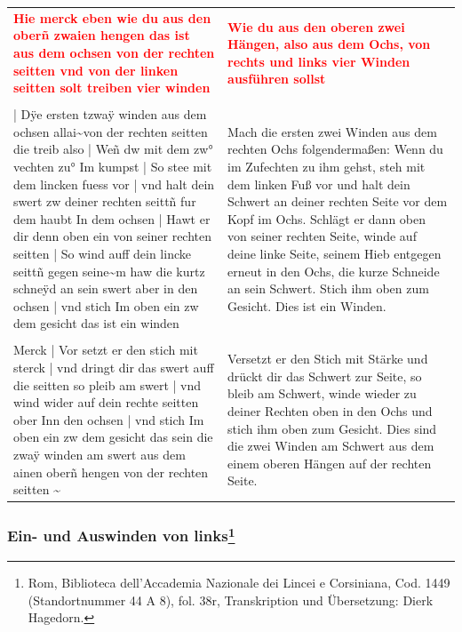 \begin{longtable}{p{6.25cm}p{6.25cm}}
\textbf{\textcolor{red}{Hie merck eben wie du aus den oberñ zwaien hengen das ist aus dem ochsen von der rechten seitten vnd von der linken seitten solt treiben vier winden}}
&
\textbf{\textcolor{red}{Wie du aus den oberen zwei Hängen, also aus dem Ochs, von rechts und links vier Winden ausführen sollst}}
\\
\\
| Dÿe ersten tzwaÿ winden aus dem ochsen allai\textasciitilde  von der rechten seitten die treib also | Weñ dw mit dem zw° vechten zu° Im kumpst | So stee mit dem lincken fuess vor | vnd halt dein swert zw deiner rechten seittñ fur dem haubt In dem ochsen | Hawt er dir denn oben ein von seiner rechten seitten | So wind auff dein lincke seittñ gegen seine\textasciitilde m haw die kurtz schneÿd an sein swert aber in den ochsen | vnd stich Im oben ein zw dem gesicht das ist ein winden 
&
Mach die ersten zwei Winden aus dem rechten Ochs folgendermaßen: Wenn du im Zufechten zu ihm gehst, steh mit dem linken Fuß vor und halt dein Schwert an deiner rechten Seite vor dem Kopf im Ochs. Schlägt er dann oben von seiner rechten Seite, winde auf deine linke Seite, seinem Hieb entgegen erneut in den Ochs, die kurze Schneide an sein Schwert. Stich ihm oben zum Gesicht. Dies ist ein Winden.
\\
\\
Merck | Vor setzt er den stich mit sterck | vnd dringt dir das swert auff die seitten so pleib am swert | vnd wind wider auf dein rechte seitten ober Inn den ochsen | vnd stich Im oben ein zw dem gesicht das sein die zwaÿ winden am swert aus dem ainen oberñ hengen von der rechten seitten \textasciitilde 
&
Versetzt er den Stich mit Stärke und drückt dir das Schwert zur Seite, so bleib am Schwert, winde wieder zu deiner Rechten oben in den Ochs und stich ihm oben zum Gesicht. Dies sind die zwei Winden am Schwert aus dem einem oberen Hängen auf der rechten Seite.
\end{longtable}

\newpage

\begin{center}
\end{center}

\newpage

\subsubsection[Ein- und Auswinden von links]{Ein- und Auswinden von links\footnote{\hspace*{0.5ex}Rom, Biblioteca dell'Accademia Nazionale dei Lincei e Corsiniana, Cod. 1449 (Standortnummer 44 A 8), fol. 38r, Transkription und Übersetzung: Dierk Hagedorn.}}

